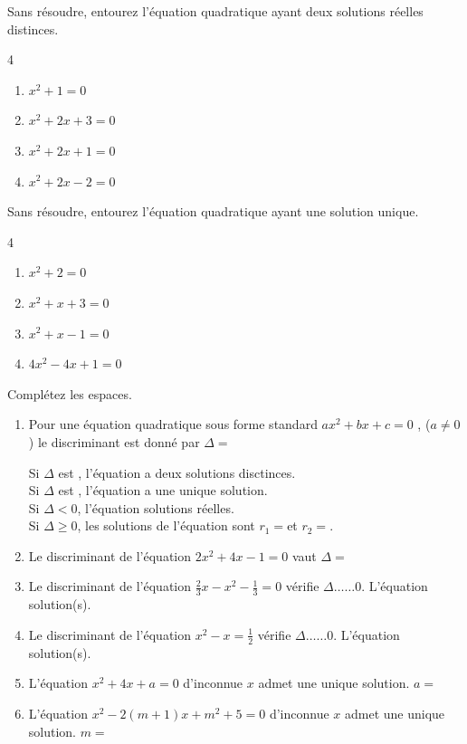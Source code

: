 \documentclass[main.tex]{subfiles}
\begin{document}
\begin{exercise} Sans résoudre, entourez l'équation quadratique ayant deux solutions réelles distinces. 
	\vspace{-1em}
	\begin{multicols}{4}
		\begin{enumerate}[label={$(E_{\arabic*})$}, leftmargin=*]
			\item $x^2+1=0$ 
			\item $x^2+2x+3=0$ 
			\item $x^2+2x+1=0$ 
			\item $x^2+2x-2=0$  
		\end{enumerate} 
	\end{multicols}  
\end{exercise}
\begin{exercise} Sans résoudre, entourez l'équation quadratique ayant une solution unique. 
	\vspace{-1em}
	\begin{multicols}{4}
		\begin{enumerate}[label={$(E_{\arabic*})$}, leftmargin=*] 
			\item $x^2+2=0$ 
			\item $x^2+x+3=0$
			\item $x^2+x-1=0$ 
			\item $4x^2-4x+1=0$  
		\end{enumerate} 
	\end{multicols}  
\end{exercise}
\begin{exercise} Complétez les espaces.
	
	\begin{enumerate}[label={\arabic*)\rule{0pt}{1.8em}},leftmargin=*] 
		\item Pour une équation quadratique sous forme standard $ax^2+bx+c=0$ , ($a\neq0$) le discriminant est donné par $\Delta=$\dotfill\medskip
		
		Si $\Delta$ est \dotfill, l'équation a deux solutions disctinces.\\\medskip
		Si $\Delta$ est \dotfill, l'équation a une unique solution.\\\medskip
		Si $\Delta<0$, l'équation \dotfill solutions réelles.\\\medskip
		Si $\Delta\geqslant 0$, les solutions de l'équation sont $r_1=$\dotfill et $r_2=$\dotfill.
		\item Le discriminant de l'équation $2x^2+4x-1=0$ vaut $\Delta=$\dotfill
		\item Le discriminant de l'équation $\frac{2}{3}x-x^2-\frac{1}{3}=0$ vérifie $\Delta\ldots\ldots 0$. L'équation \dotfill solution(s).
		\item Le discriminant de l'équation $x^2-x=\frac{1}{2}$ vérifie $\Delta\ldots\ldots 0$. L'équation \dotfill  solution(s).
		\item L'équation $x^2+4x+a=0$ d'inconnue $x$ admet une unique solution. $a=$\dotfill
		\item  L'équation $x^2-2(m+1)x+m^2+5=0$ d'inconnue $x$ admet une unique solution. $m=$\dotfill 
	\end{enumerate}
\end{exercise}
\end{document}
